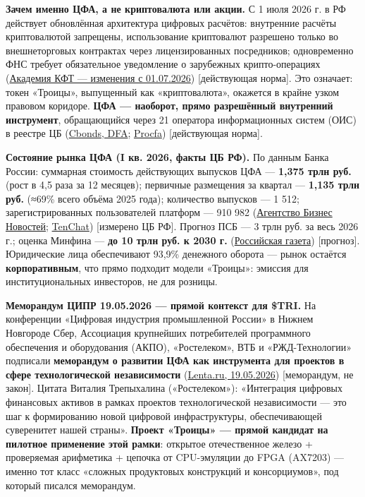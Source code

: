 \documentclass[
  russian,
]{article}
\begin{document}
\textbf{Зачем именно ЦФА, а не криптовалюта или акции.} С 1 июля 2026 г.
в РФ действует обновлённая архитектура цифровых расчётов: внутренние
расчёты криптовалютой запрещены, использование криптовалют разрешено
только во внешнеторговых контрактах через лицензированных посредников;
одновременно ФНС требует обязательное уведомление о зарубежных
крипто-операциях
(\href{https://akft.ru/novosti/otkrytyj-vecher-akademii-glavnye-izmeneniya-rynka-czfa-s-1-iyulya-2026-goda/}{Академия
КФТ --- изменения с 01.07.2026}) {[}действующая норма{]}. Это означает:
токен «Троицы», выпущенный как «криптовалюта», окажется в крайне узком
правовом коридоре. \textbf{ЦФА --- наоборот, прямо разрешённый
внутренний инструмент}, обращающийся через 21 оператора информационных
систем (ОИС) в реестре ЦБ (\href{https://cbonds.ru/dfa/}{Cbonds, DFA};
\href{https://procfa.ru/reestr-platform-czfa-popolnilsya-novoj-kompaniej/}{Procfa})
{[}действующая норма{]}.

\textbf{Состояние рынка ЦФА (I кв. 2026, факты ЦБ РФ).} По данным Банка
России: суммарная стоимость действующих выпусков ЦФА --- \textbf{1,375
трлн руб.} (рост в 4,5 раза за 12 месяцев); первичные размещения за
квартал --- \textbf{1,135 трлн руб.} (≈69\% всего объёма 2025 года);
количество выпусков --- 1 512; зарегистрированных пользователей платформ
--- 910 982
(\href{https://abn.agency/2026/06/11/rynok-czfa-prevysil-1375-trln-rublej/}{Агентство
Бизнес Новостей};
\href{https://tenchat.ru/media/5504853-1375-trln-rubley-za-kvartal-rynok-tsfa-udvoilsya-i-prodolzhayet-rasti}{TenChat})
{[}измерено ЦБ РФ{]}. Прогноз ПСБ --- 3 трлн руб. за весь 2026 г.;
оценка Минфина --- \textbf{до 10 трлн руб. к 2030 г.}
(\href{https://rg.ru/amp/2026/05/18/vecherom-dengi.html}{Российская
газета}) {[}прогноз{]}. Юридические лица обеспечивают 93,9\% денежного
оборота --- рынок остаётся \textbf{корпоративным}, что прямо подходит
модели «Троицы»: эмиссия для институциональных инвесторов, не для
розницы.

\textbf{Меморандум ЦИПР 19.05.2026 --- прямой контекст для \$TRI.} На
конференции «Цифровая индустрия промышленной России» в Нижнем Новгороде
Сбер, Ассоциация крупнейших потребителей программного обеспечения и
оборудования (АКПО), «Ростелеком», ВТБ и «РЖД-Технологии» подписали
\textbf{меморандум о развитии ЦФА как инструмента для проектов в сфере
технологической независимости}
(\href{https://lenta.ru/news/2026/05/19/na-tsipr-podpisan-memorandum-o-tsfa-dlya-proektov-v-sfere-tehnologicheskoy-nezavisimosti/}{Lenta.ru,
19.05.2026}) {[}меморандум, не закон{]}. Цитата Виталия Трепыхалина
(«Ростелеком»): «Интеграция цифровых финансовых активов в рамках
проектов технологической независимости --- это шаг к формированию новой
цифровой инфраструктуры, обеспечивающей суверенитет нашей страны».
\textbf{Проект «Троицы» --- прямой кандидат на пилотное применение этой
рамки}: открытое отечественное железо + проверяемая арифметика + цепочка
от CPU-эмуляции до FPGA (AX7203) --- именно тот класс «сложных продуктовых
конструкций и консорциумов», под который писался меморандум.
\end{document}
